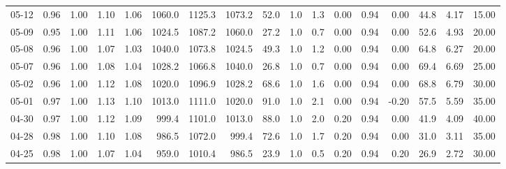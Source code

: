 \begin{threeparttable}
{\begin{tabular}{lrrrrrrrrrrrrrrrr}
  05-12 &         0.96 &           1.00 &          1.10 &          1.06 & 1060.0 & 1125.3 & 1073.2 &       52.0 &                      1.0 &                 1.3 &       0.00 &      0.94 &           0.00 &             44.8 &            4.17 &                  15.00 \\
  05-09 &         0.95 &           1.00 &          1.11 &          1.06 & 1024.5 & 1087.2 & 1060.0 &       27.2 &                      1.0 &                 0.7 &       0.00 &      0.94 &           0.00 &             52.6 &            4.93 &                  20.00 \\
  05-08 &         0.96 &           1.00 &          1.07 &          1.03 & 1040.0 & 1073.8 & 1024.5 &       49.3 &                      1.0 &                 1.2 &       0.00 &      0.94 &           0.00 &             64.8 &            6.27 &                  20.00 \\
  05-07 &         0.96 &           1.00 &          1.08 &          1.04 & 1028.2 & 1066.8 & 1040.0 &       26.8 &                      1.0 &                 0.7 &       0.00 &      0.94 &           0.00 &             69.4 &            6.69 &                  25.00 \\
  05-02 &         0.96 &           1.00 &          1.12 &          1.08 & 1020.0 & 1096.9 & 1028.2 &       68.6 &                      1.0 &                 1.6 &       0.00 &      0.94 &           0.00 &             68.8 &            6.79 &                  30.00 \\
  05-01 &         0.97 &           1.00 &          1.13 &          1.10 & 1013.0 & 1111.0 & 1020.0 &       91.0 &                      1.0 &                 2.1 &       0.00 &      0.94 &          -0.20 &             57.5 &            5.59 &                  35.00 \\
  04-30 &         0.97 &           1.00 &          1.12 &          1.09 &  999.4 & 1101.0 & 1013.0 &       88.0 &                      1.0 &                 2.0 &       0.20 &      0.94 &           0.00 &             41.9 &            4.09 &                  40.00 \\
  04-28 &         0.98 &           1.00 &          1.10 &          1.08 &  986.5 & 1072.0 &  999.4 &       72.6 &                      1.0 &                 1.7 &       0.20 &      0.94 &           0.00 &             31.0 &            3.11 &                  35.00 \\
  04-25 &         0.98 &           1.00 &          1.07 &          1.04 &  959.0 & 1010.4 &  986.5 &       23.9 &                      1.0 &                 0.5 &       0.20 &      0.94 &           0.20 &             26.9 &            2.72 &                  30.00 \\

\end{tabular}}
\end{threeparttable}
